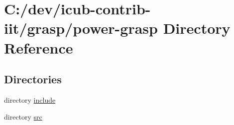 \section{C\+:/dev/icub-\/contrib-\/iit/grasp/power-\/grasp Directory Reference}
\label{dir_7f4a492f0495462febe3696ea0450141}
\subsection*{Directories}
\begin{DoxyCompactItemize}
\item 
directory \hyperlink{dir_28a869c415a9705df3d185be1ad83cff}{include}
\item 
directory \hyperlink{dir_cbbc0e5a003716b26669cba433d66af2}{src}
\end{DoxyCompactItemize}
